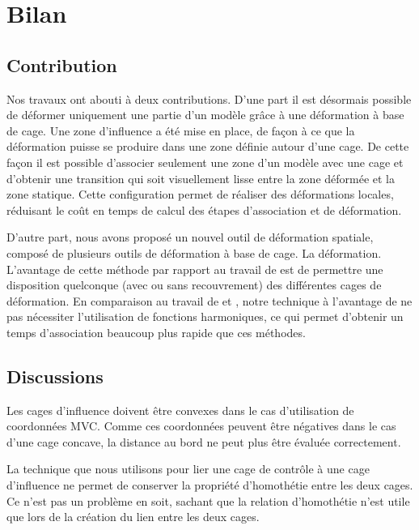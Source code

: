 
\def\baselinestretch{1}
\chapter{Bilan}
\ifpdf
\graphicspath{{Conclusions/ConclusionsFigs/PNG/}{Conclusions/ConclusionsFigs/PDF/}{Conclusions/ConclusionsFigs/}}
\else
\graphicspath{{Conclusions/ConclusionsFigs/EPS/}{Conclusions/ConclusionsFigs/}}
\fi

\section{Contribution}

Nos travaux ont abouti à deux contributions. D'une part il est désormais
possible de déformer uniquement une partie d'un modèle grâce à une déformation
à base de cage. Une zone d'influence a été mise en place, de façon à ce que la
déformation puisse se produire dans une zone définie autour d'une cage. De
cette façon il est possible d'associer seulement une zone d'un modèle avec une
cage et d'obtenir une transition qui soit visuellement lisse entre la zone
déformée et la zone statique. Cette configuration permet de réaliser des
déformations locales, réduisant le coût en temps de calcul des étapes
d'association et de déformation.

D'autre part, nous avons proposé un nouvel outil de déformation spatiale,
composé de plusieurs outils de déformation à base de cage. La déformation.
L'avantage de cette méthode par rapport au travail de \cite{GPCP13} est de
permettre une disposition quelconque (avec ou sans recouvrement) des
différentes cages de déformation. En comparaison au travail de \cite{JBPS11}
et \cite{GPCP13}, notre technique à l'avantage de ne pas nécessiter
l'utilisation de fonctions harmoniques, ce qui permet d'obtenir un temps
d'association beaucoup plus rapide que ces méthodes.

\section{Discussions}

Les cages d'influence doivent être convexes dans le cas d'utilisation de
coordonnées MVC. Comme ces coordonnées peuvent être négatives dans le cas
d'une cage concave, la distance au bord ne peut plus être évaluée
correctement.

La technique que nous utilisons pour lier une cage de contrôle à une cage
d'influence ne permet de conserver la propriété d'homothétie entre les deux
cages. Ce n'est pas un problème en soit, sachant que la relation d'homothétie
n'est utile que lors de la création du lien entre les deux cages.

